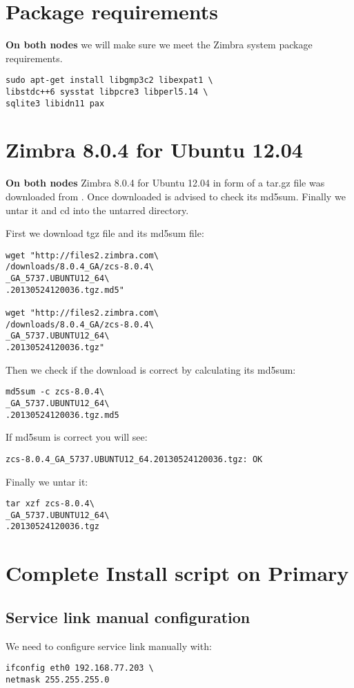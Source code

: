 \section {Package requirements}
\textbf{On both nodes} we will make sure we meet the Zimbra system package requirements.

\begin{verbatim}
sudo apt-get install libgmp3c2 libexpat1 \
libstdc++6 sysstat libpcre3 libperl5.14 \
sqlite3 libidn11 pax
\end{verbatim}

\section {Zimbra 8.0.4 for Ubuntu 12.04}
\textbf{On both nodes}
Zimbra 8.0.4 for Ubuntu 12.04 in form of a tar.gz file was downloaded from \cite{Zimbra8Download}.
Once downloaded is advised to check its md5sum. Finally we untar it and cd into the untarred directory.

First we download tgz file and its md5sum file:
\begin{verbatim}
wget "http://files2.zimbra.com\
/downloads/8.0.4_GA/zcs-8.0.4\
_GA_5737.UBUNTU12_64\
.20130524120036.tgz.md5"

wget "http://files2.zimbra.com\
/downloads/8.0.4_GA/zcs-8.0.4\
_GA_5737.UBUNTU12_64\
.20130524120036.tgz"
\end{verbatim}
Then we check if the download is correct by calculating its md5sum:
\begin{verbatim}
md5sum -c zcs-8.0.4\
_GA_5737.UBUNTU12_64\
.20130524120036.tgz.md5
\end{verbatim}
If md5sum is correct you will see:
\begin{verbatim}
zcs-8.0.4_GA_5737.UBUNTU12_64.20130524120036.tgz: OK
\end{verbatim}
Finally we untar it:
\begin{verbatim}
tar xzf zcs-8.0.4\
_GA_5737.UBUNTU12_64\
.20130524120036.tgz
\end{verbatim}

\section {\label{sec:complete-install-script-on-primary}Complete Install script on Primary}
\subsection {Service link manual configuration}
We need to configure service link manually with:
\begin{verbatim}
ifconfig eth0 192.168.77.203 \
netmask 255.255.255.0
\end{verbatim}


